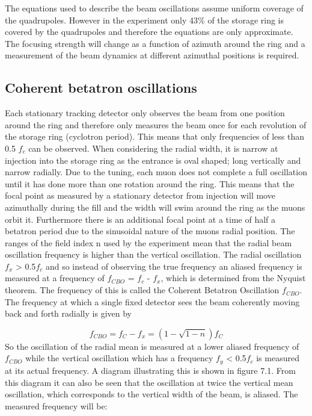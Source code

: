 The equations used to describe the beam oscillations assume uniform coverage of the quadrupoles. However in the experiment only 43$\%$ of the storage ring is covered by the quadrupoles and therefore the equations are only approximate. The focusing strength will change as a function of azimuth around the ring and a measurement of the beam dynamics at different azimuthal positions is required.

\subsection{Coherent betatron oscillations}

Each stationary tracking detector only observes the beam from one position around the ring and therefore only measures the beam once for each revolution of the storage ring (cyclotron period). This means that only frequencies of less than 0.5 $f_{c}$ can be observed. When considering the radial width, it is narrow at injection into the storage ring as the entrance is oval shaped; long vertically and narrow radially. Due to the tuning, each muon does not complete a full oscillation until it has done more than one rotation around the ring. This means that the focal point as measured by a stationary detector from injection will move azimuthally during the fill and the width will swim around the ring as the muons orbit it. Furthermore there is an additional focal point at a time of half a betatron period due to the sinusoidal nature of the muons radial position.
The ranges of the field index n used by the experiment mean that the radial beam oscillation frequency is higher than the vertical oscillation. The radial oscillation $f_{x}$ > 0.5$f_{c}$ and so instead of observing the true frequency an aliased frequency is measured at a frequency of $f_{CBO}$ = $f_{c}$ - $f_{x}$, which is determined from the Nyquist theorem. The frequency of this is called the Coherent Betatron Oscillation $f_{CBO}$. 
The frequency at which a single fixed detector sees the beam coherently moving back and forth radially is given by

\begin{equation}
f_{CBO} = f_{C} - f_{x} = (1 - \sqrt{1-n})f_{C}
\end{equation}
So the oscillation of the radial mean is measured at a lower aliased frequency of $f_{CBO}$ while the vertical oscillation which has a frequency $f_{y}$ < 0.5$f_{c}$ is measured at its actual frequency. A diagram illustrating this is shown in figure 7.1. From this diagram it can also be seen that the oscillation at twice the vertical mean oscillation, which corresponds to the vertical width of the beam, is aliased. The measured frequency will be: 

